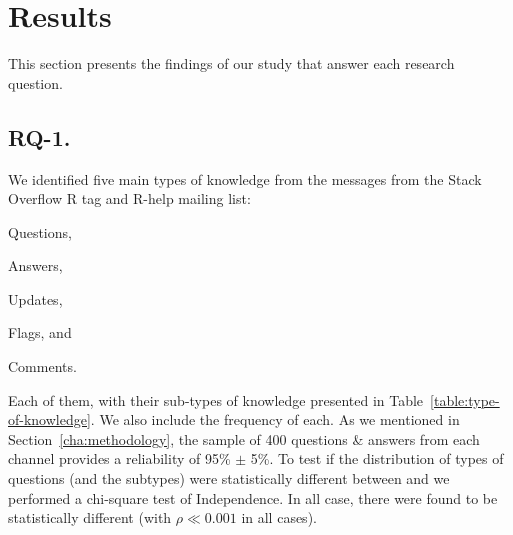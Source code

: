 \section{Results}
\label{cha:findings}

This section presents the findings of our study that answer each research question.

\subsection{RQ-1. \rqa}
\label{cha:findings-types}


We identified five main types of knowledge from the messages from the Stack Overflow R tag and R-help mailing list:
\begin{enumerate*}[label=(\arabic*)]
\item Questions,
\item Answers,
\item Updates,
\item Flags, and
\item Comments.
\end{enumerate*}
    Each of them, with their sub-types of knowledge presented in Table~\ref{table:type-of-knowledge}. We also include the frequency of each. As we mentioned in Section~\ref{cha:methodology}, the sample of 400 questions \& answers from each channel provides a reliability of 95\% $\pm$ 5\%.
    To test if the distribution of types of questions (and the subtypes) were statistically different between \SO and \RH we performed a chi-square test of Independence. In all case, there were found to be statistically different (with $\rho \ll  0.001$ in all cases).

